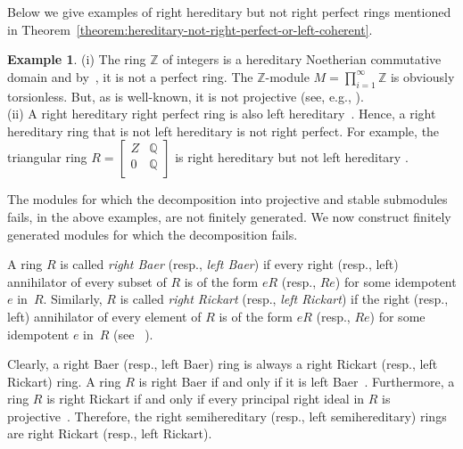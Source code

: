 \documentclass[11pt,a4paper]{amsart}
\theoremstyle{plain}
\theoremstyle{definition}
\newtheorem{example}[theorem]{Example}
\theoremstyle{remark}
\newcommand{\Z}{{\mathbb{Z}}}
\newcommand{\Q}{{\mathbb{Q}}}
\begin{document}
{Below we give examples of right hereditary but not right perfect rings mentioned in Theorem~\ref{theorem:hereditary-not-right-perfect-or-left-coherent}.}

\begin{example}{(i) The ring $\Z$ of integers is a hereditary Noetherian commutative domain and by~\cite[Theorem 23.24]{Lam:AFirstCourseInNoncommutativeRingsSecondEdition}, it is not a perfect ring. The $\Z$-module $ M= \prod\limits_{i=1}^{\infty}\Z $ is obviously torsionless. But, as is well-known, it is not projective (see, e.g., \cite[Example 2.8]{Lam:LecturesOnModulesAndRings}).
\\
(ii) A right hereditary right perfect ring is also left hereditary~\cite[Corollary 2]{Small:SemihereditaryRings}. Hence, a right hereditary ring that is not left hereditary is not right perfect. For example, the triangular ring
$R=\left[
\begin{array}{cc}
Z & \Q \\
0 & \Q \\
\end{array}
\right]$
is right hereditary but not left hereditary \cite[Small's Example 2.33]{Lam:LecturesOnModulesAndRings}.}
\end{example} 

The modules for which the decomposition into projective and stable submodules fails, in the  above examples, are not finitely generated. We now construct finitely generated modules for which the decomposition fails.

A ring $R$ is called \emph{right Baer} (resp., \emph{left Baer}) if every right (resp., left) annihilator of every subset of $R$ is of the form $eR$  (resp., $Re$) for some idempotent $e$ in~$R$. Similarly, $R$ is called \emph{right Rickart} (resp., \emph{left Rickart}) if the right (resp., left) annihilator of every element of $R$ is of the form  $eR$  (resp., $Re$) for some idempotent $e$ in~$R$ (see ~\cite[Section 7D]{Lam:LecturesOnModulesAndRings}).

Clearly, a right Baer (resp., left Baer) ring is always a right Rickart (resp., left Rickart) ring. A ring $R$ is right Baer if and only if it is left Baer~\cite[Proposition 7.46]{Lam:LecturesOnModulesAndRings}. Furthermore, a ring $R$ is right Rickart if and only if every principal right ideal in $R$ is projective~\cite[Proposition 7.48]{Lam:LecturesOnModulesAndRings}. Therefore, the right semihereditary (resp., left semihereditary) rings are right Rickart (resp., left Rickart).
\end{document}
